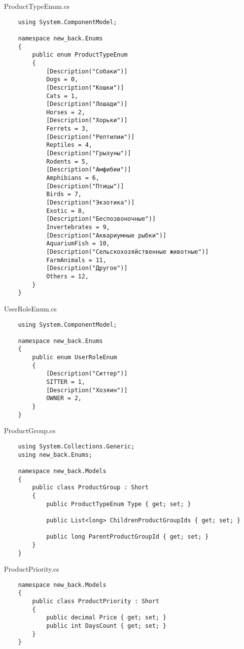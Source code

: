 ProductTypeEnum.cs
\lstset{style=sharpc}
\begin{lstlisting}
    using System.ComponentModel;

    namespace new_back.Enums
    {
        public enum ProductTypeEnum
        {
            [Description("Собаки")]
            Dogs = 0,
            [Description("Кошки")]
            Cats = 1,
            [Description("Лошади")]
            Horses = 2,
            [Description("Хорьки")]
            Ferrets = 3,
            [Description("Рептилии")]
            Reptiles = 4,
            [Description("Грызуны")]
            Rodents = 5,
            [Description("Амфибии")]
            Amphibians = 6,
            [Description("Птицы")]
            Birds = 7,
            [Description("Экзотика")]
            Exotic = 8,
            [Description("Беспозвоночные")]
            Invertebrates = 9,
            [Description("Аквариумные рыбки")]
            AquariumFish = 10,
            [Description("Сельскохозяйственные животные")]
            FarmAnimals = 11,
            [Description("Другое")]
            Others = 12,
        }
    }
\end{lstlisting}

UserRoleEnum.cs
\lstset{style=sharpc}
\begin{lstlisting}
    using System.ComponentModel;

    namespace new_back.Enums
    {
        public enum UserRoleEnum
        {
            [Description("Ситтер")]
            SITTER = 1,
            [Description("Хозяин")]
            OWNER = 2,
        }
    }
\end{lstlisting}

ProductGroup.cs
\lstset{style=sharpc}
\begin{lstlisting}
    using System.Collections.Generic;
    using new_back.Enums;
    
    namespace new_back.Models
    {
        public class ProductGroup : Short
        {
            public ProductTypeEnum Type { get; set; }
            
            public List<long> ChildrenProductGroupIds { get; set; }
            
            public long ParentProductGroupId { get; set; }
        }
    }
\end{lstlisting}

ProductPriority.cs
\lstset{style=sharpc}
\begin{lstlisting}
    namespace new_back.Models
    {
        public class ProductPriority : Short
        {
            public decimal Price { get; set; }
            public int DaysCount { get; set; }
        }
    }
\end{lstlisting}

